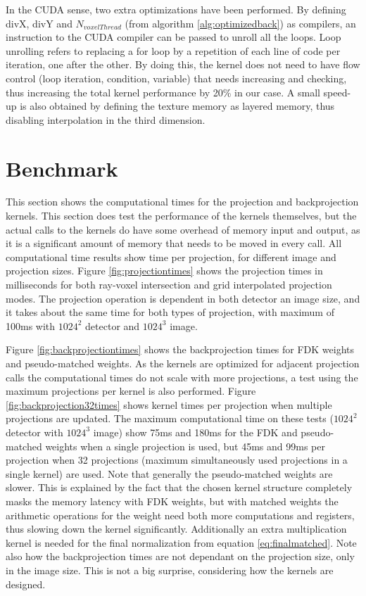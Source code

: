 In the CUDA sense, two extra optimizations have been performed. By defining divX, divY and $N_{voxelThread}$ (from algorithm \ref{alg:optimizedback}) as compilers, an instruction to the CUDA compiler can be passed to unroll all the loops. Loop unrolling refers to replacing a for loop by a repetition of each line of code per iteration, one after the other. By doing this, the kernel does not need to have flow control (loop iteration, condition, variable) that needs increasing and checking, thus increasing the total kernel performance by 20\% in our case. A small speed-up is also obtained by defining the texture memory as layered memory, thus disabling interpolation in the third dimension.


\FloatBarrier
\section{Benchmark}\label{sec:speed}

This section shows the computational times for the projection and backprojection kernels. This section does test the performance of the kernels themselves, but the actual calls to the kernels do have some overhead of memory input and output, as it is a significant amount of memory that needs to be moved in every call. All computational time results show time per projection, for different image and projection sizes. Figure \ref{fig:projectiontimes} shows the projection times in milliseconds for both ray-voxel intersection and grid interpolated projection modes. The projection operation is dependent in both detector an image size, and it takes about the same time for both types of projection, with  maximum of 100ms with $1024^2$ detector and $1024^3$ image.


 Figure \ref{fig:backprojectiontimes} shows the backprojection times for FDK weights and pseudo-matched weights. As the kernels are optimized for adjacent projection calls the computational times do not scale with more projections, a test using the maximum projections per kernel is also performed. Figure \ref{fig:backprojection32times} shows kernel times per projection when multiple projections are updated. The maximum computational time on these tests ($1024^2$ detector with $1024^3$ image) show 75ms and 180ms for the FDK and pseudo-matched weights when a single projection is used, but 45ms and 99ms per projection when 32 projections (maximum simultaneously used projections in a single kernel) are used. Note that generally the pseudo-matched weights are slower. This is explained by the fact that the chosen kernel structure completely masks the memory latency with FDK weights, but with matched weights the arithmetic operations for the weight need both more computations and registers, thus slowing down the kernel significantly. Additionally an extra multiplication kernel is needed for the final normalization from equation \ref{eq:finalmatched}. Note also how the backprojection times are not dependant on the projection size, only in the image size. This is not a big surprise, considering how the kernels are designed.
 
